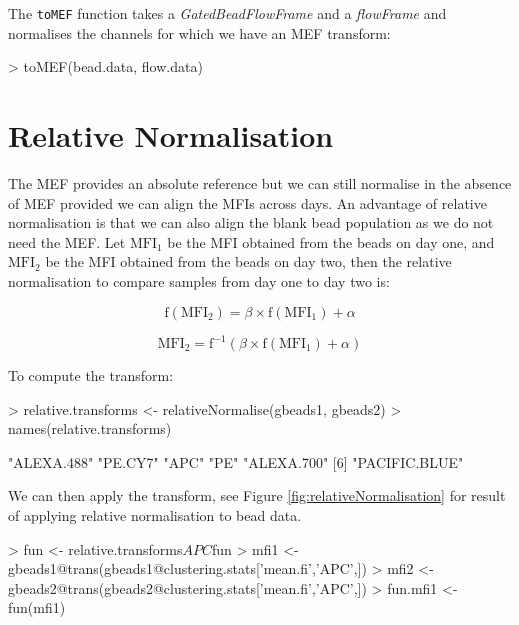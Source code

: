 \documentclass[11pt]{article}
\newcommand{\Rcode}[1]{{\texttt{#1}}}
\newcommand{\Rclass}[1]{{\textit{#1}}}
\begin{document}
\noindent
The \Rcode{toMEF} function takes a \Rclass{GatedBeadFlowFrame} and a \Rclass{flowFrame} and normalises the channels
for which we have an MEF transform:

\begin{Schunk}
\begin{Sinput}
> toMEF(bead.data, flow.data)
\end{Sinput}
\end{Schunk}

\section{Relative Normalisation}

The MEF provides an absolute reference but we can still normalise in the absence of MEF provided we can align the MFIs across days.
An advantage of relative normalisation is that we can also align the blank bead population as we do not need the MEF.
Let $\text{MFI}_{1}$ be the MFI obtained from the beads on day one, and $\text{MFI}_{2}$ be the MFI obtained from the beads on day two,
then the relative normalisation to compare samples from day one to day two is:

\[
\text{f}(\text{MFI}_{2}) = \beta \times \text{f}(\text{MFI}_{1}) + \alpha
\]

\[
\text{MFI}_{2} = \text{f}^{-1} ( \beta \times \text{f}(\text{MFI}_{1}) + \alpha )
\]

\noindent
To compute the transform:
\begin{Schunk}
\begin{Sinput}
> relative.transforms <- relativeNormalise(gbeads1, gbeads2)
> names(relative.transforms)
\end{Sinput}
\begin{Soutput}
[1] "ALEXA.488"    "PE.CY7"       "APC"          "PE"           "ALEXA.700"   
[6] "PACIFIC.BLUE"
\end{Soutput}
\end{Schunk}
We can then apply the transform, see Figure \ref{fig:relativeNormalisation} for result of applying relative normalisation to bead data.
\begin{Schunk}
\begin{Sinput}
> fun <- relative.transforms$APC$fun
> mfi1 <- gbeads1@trans(gbeads1@clustering.stats['mean.fi','APC',])
> mfi2 <- gbeads2@trans(gbeads2@clustering.stats['mean.fi','APC',])
> fun.mfi1 <- fun(mfi1)
\end{Sinput}
\end{Schunk}
\end{document}
